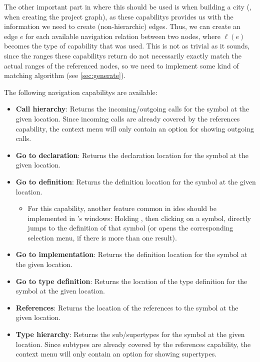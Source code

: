 \documentclass[../thesis]{subfiles}
\begin{document}
The other important part in \SEE{} where this should be used is when building a city (\ie, when creating the project graph), as these \glspl{capability} provides us with the information we need to create (non-hierarchic) edges.
Thus, we can create an edge $e$ for each available navigation relation between two nodes, where $\ell(e)$ becomes the type of \gls{capability} that was used.
This is not as trivial as it sounds, since the \glspl{range} these \glspl{capability} return do not necessarily exactly match the actual \glspl{range} of the referenced nodes, so we need to implement some kind of matching algorithm (see \cref{sec:generate}).

The following navigation \glspl{capability} are available:
\begin{itemize}
	\item \textbf{Call hierarchy}: Returns the incoming/outgoing calls for the symbol at the given location.
	      Since incoming calls are already covered by the references \gls{capability}, the context menu will only contain an option for showing outgoing calls.
	\item \textbf{Go to declaration}: Returns the declaration location for the symbol at the given location.
	\item \textbf{Go to definition}: Returns the definition location for the symbol at the given location.
	      \begin{itemize}
		      \item For this \gls{capability}, another feature common in \glspl{ide} should be implemented in \SEE{}'s \glspl{window}:
		            Holding , then clicking on a symbol, directly jumps to the definition of that symbol (or opens the corresponding selection menu, if there is more than one result).
	      \end{itemize}
	\item \textbf{Go to implementation}: Returns the definition location for the symbol at the given location.
	\item \textbf{Go to type definition}: Returns the location of the type definition for the symbol at the given location.
	\item \textbf{References}: Returns the location of the references to the symbol at the given location.
	\item \textbf{Type hierarchy}: Returns the sub/supertypes for the symbol at the given location.
	      Since subtypes are already covered by the references \gls{capability}, the context menu will only contain an option for showing supertypes.
\end{itemize}
\end{document}
